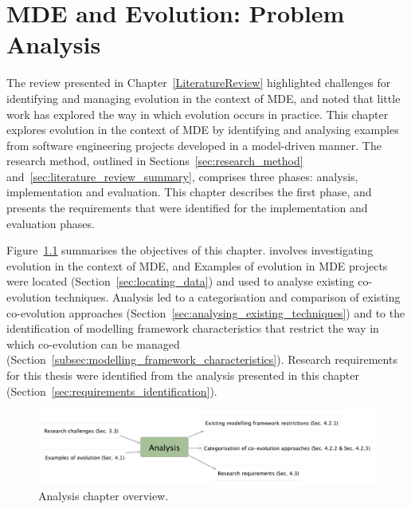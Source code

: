 
\chapter{MDE and Evolution: Problem Analysis}
\label{Analysis}
The review presented in Chapter~\ref{LiteratureReview} highlighted challenges for identifying and managing evolution in the context of MDE, and noted that little work has explored the way in which evolution occurs in practice. This chapter explores evolution in the context of MDE by identifying and analysing examples from software engineering projects developed in a model-driven manner. The research method, outlined in Sections~\ref{sec:research_method} and~\ref{sec:literature_review_summary}, comprises three phases: analysis, implementation and evaluation. This chapter describes the first phase, and presents the requirements that were identified for the implementation and evaluation phases.

Figure~\ref{fig:analysis_overview} summarises the objectives of this chapter. involves investigating evolution in the context of MDE, and  Examples of evolution in MDE projects were located (Section~\ref{sec:locating_data}) and used to analyse existing co-evolution techniques. Analysis led to a categorisation and comparison of existing co-evolution approaches (Section~\ref{sec:analysing_existing_techniques}) and to the identification of modelling framework characteristics that restrict the way in which co-evolution can be managed (Section~\ref{subsec:modelling_framework_characteristics}). Research requirements for this thesis were identified from the analysis presented in this chapter (Section~\ref{sec:requirements_identification}).


\begin{figure}[htbp]
  \begin{center}
    \leavevmode
    \includegraphics[width=12cm]{4.Analysis/overview.pdf}
  \end{center}
  \caption{Analysis chapter overview.}
  \label{fig:analysis_overview}
\end{figure}


